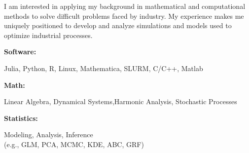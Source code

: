 \documentclass[9pt]{developercv} %
\begin{document}
\begin{minipage}[t]{0.46\textwidth}
	\vspace{-6pt}

	I am interested in applying my background in mathematical and computational methods to solve difficult problems faced by industry. My experience makes me uniquely positioned to develop and analyze simulations and models used to optimize industrial processes. \\
 
\end{minipage}
\hfill %
\begin{minipage}[t]{0.465\textwidth}
    \vspace{-6pt}
    
    \begin{minipage}[t]{0.2\textwidth}
        \textbf{Software:}
    \end{minipage}
    \hfill
    \begin{minipage}[t]{0.75\textwidth}
      Julia, Python, R, Linux, Mathematica, SLURM, C/C++, Matlab
    \end{minipage}
    \vspace{4mm}

    \vspace{-5 pt}
    \begin{minipage}[t]{0.2\textwidth}
        \textbf{Math:}
    \end{minipage}
    \hfill
    \begin{minipage}[t]{0.75\textwidth}
      Linear Algebra, Dynamical Systems,\newline Harmonic Analysis, Stochastic Processes
    \end{minipage}
    \vspace{4mm}

    \vspace{-5 pt}
    \begin{minipage}[t]{0.2\textwidth}
        \textbf{Statistics:}
    \end{minipage}
    \hfill
    \begin{minipage}[t]{0.75\textwidth}
      Modeling, Analysis, Inference
      \\ (e.g., GLM, PCA, MCMC, KDE, ABC, GRF)
    \end{minipage}
    
\end{minipage}
\end{document}
